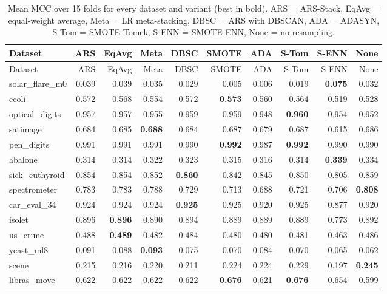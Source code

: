 {\small\setlength{\tabcolsep}{3.5pt}
\begin{longtable}{lrrrrrrrrr}
\caption{Mean MCC over 15 folds for every dataset and variant (best in bold). ARS = ARS-Stack, EqAvg = equal-weight average, Meta = LR meta-stacking, DBSC = ARS with DBSCAN, ADA = ADASYN, S-Tom = SMOTE-Tomek, S-ENN = SMOTE-ENN, None = no resampling.}\label{tab:full_mcc}\\
\toprule
Dataset & ARS & EqAvg & Meta & DBSC & SMOTE & ADA & S-Tom & S-ENN & None \\
\midrule
\endfirsthead
\toprule
Dataset & ARS & EqAvg & Meta & DBSC & SMOTE & ADA & S-Tom & S-ENN & None \\
\midrule
\endhead
solar\_flare\_m0 & 0.039 & 0.039 & 0.035 & 0.029 & 0.005 & 0.006 & 0.019 & \textbf{0.075} & 0.032 \\
ecoli & 0.572 & 0.568 & 0.554 & 0.572 & \textbf{0.573} & 0.560 & 0.564 & 0.519 & 0.528 \\
optical\_digits & 0.957 & 0.957 & 0.955 & 0.959 & 0.959 & 0.948 & \textbf{0.960} & 0.954 & 0.952 \\
satimage & 0.684 & 0.685 & \textbf{0.688} & 0.684 & 0.687 & 0.679 & 0.687 & 0.615 & 0.686 \\
pen\_digits & 0.991 & 0.991 & 0.991 & 0.990 & \textbf{0.992} & 0.987 & \textbf{0.992} & 0.990 & 0.990 \\
abalone & 0.314 & 0.314 & 0.322 & 0.323 & 0.315 & 0.316 & 0.314 & \textbf{0.339} & 0.334 \\
sick\_euthyroid & 0.854 & 0.854 & 0.852 & \textbf{0.860} & 0.842 & 0.845 & 0.850 & 0.805 & 0.859 \\
spectrometer & 0.783 & 0.783 & 0.788 & 0.729 & 0.713 & 0.688 & 0.721 & 0.706 & \textbf{0.808} \\
car\_eval\_34 & 0.924 & 0.924 & 0.924 & \textbf{0.925} & 0.925 & 0.920 & 0.925 & 0.877 & 0.920 \\
isolet & 0.896 & \textbf{0.896} & 0.890 & 0.894 & 0.889 & 0.889 & 0.889 & 0.773 & 0.892 \\
us\_crime & 0.488 & \textbf{0.489} & 0.482 & 0.484 & 0.480 & 0.480 & 0.481 & 0.463 & 0.486 \\
yeast\_ml8 & 0.091 & 0.088 & \textbf{0.093} & 0.075 & 0.070 & 0.084 & 0.070 & 0.065 & 0.062 \\
scene & 0.215 & 0.216 & 0.220 & 0.211 & 0.224 & 0.224 & 0.229 & 0.197 & \textbf{0.245} \\
libras\_move & 0.622 & 0.622 & 0.622 & 0.622 & \textbf{0.676} & 0.621 & \textbf{0.676} & 0.654 & 0.599 \\

\end{longtable}}

